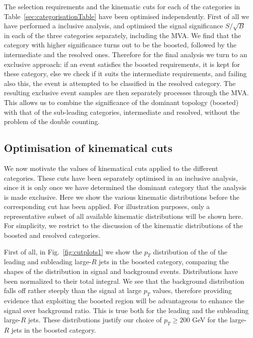 The selection requirements and the kinematic cuts
for each of the categories in Table~\ref{sec:categorisationTable} have
been optimised independently.
%
First of all we have performed a inclusive analysis, and optimised the
signal significance
$S/\sqrt{B}$ in each of the three categories separately, including
the MVA.
%
We find that the category with higher significance turns out to be the boosted,
followed by the intermediate and the resolved ones.
%
Therefore for the final analysis we turn to an exclusive approach:
if an event satisfies the boosted requirements, it is kept for
these category, else we check if it suits the intermediate
requirements, and failing also this, the event is attempted to
be classified in the
resolved category.
%
The resulting exclusive event samples are then separately processes
through the MVA.
%
This allows us to combine the significance of the dominant topology
(boosted) with that of the sub-leading categories, intermediate
and resolved, without the problem of the double counting.







\subsection{Optimisation of kinematical cuts}

We now motivate the values of
kinematical cuts applied to the different categories.
%
These cuts have been separately
optimised in an inclusive analysis, since it is only
once we have determined
the dominant category that the analysis is made exclusive.
%
Here we show the various kinematic distributions 
before the corresponding cut has been applied.
%
For illustration purposes,
only a representative subset of
all available kinematic distributions will be shown here.
%
For simplicity,
we restrict to the discussion of the
kinematic distributions of the boosted
and resolved categories.


First of all,
in Fig.~\ref{fig:cutplots1} we show
the $p_T$ distribution of the 
of the
  leading and subleading large-$R$ jets in the boosted category, comparing
  the shapes of the distribution in signal and background events.
  Distributions have been normalized to their total integral.
  We see that the background distribution
  falls off rather steeply than the signal at large $p_T$
  values, therefore
  providing evidence that exploiting the boosted region will be
  advantageous to enhance the signal over background ratio.
  This is true both for the leading and the subleading
  large-$R$ jets.
  These distributions justify our choice of $p_T \ge 200$ GeV
  for the large-$R$ jets in the boosted category.
  

